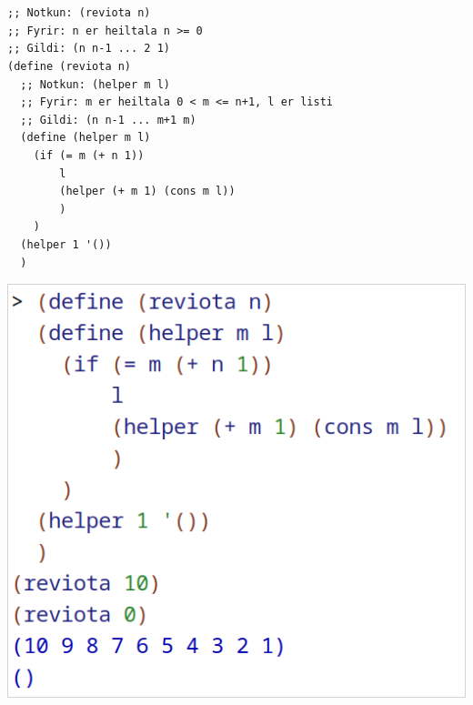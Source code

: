 \documentclass{article}
\begin{document}
	\newpage
	\section{}
	\begin{verbatim}
;; Notkun: (reviota n)
;; Fyrir: n er heiltala n >= 0
;; Gildi: (n n-1 ... 2 1)
(define (reviota n)
  ;; Notkun: (helper m l)
  ;; Fyrir: m er heiltala 0 < m <= n+1, l er listi
  ;; Gildi: (n n-1 ... m+1 m)
  (define (helper m l)
    (if (= m (+ n 1))
        l
        (helper (+ m 1) (cons m l))
        )
    )
  (helper 1 '())
  )
	\end{verbatim}
	\begin{center}
		\includegraphics[scale=0.35]{reviota.png}
	\end{center}
\end{document}
